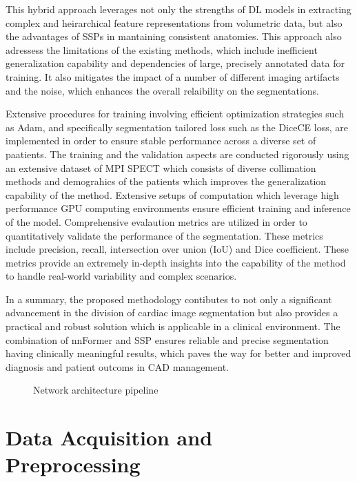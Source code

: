 This hybrid approach leverages not only the strengths of DL models in extracting complex and heirarchical feature representations from volumetric data, but also the advantages of SSPs in mantaining consistent anatomies. This approach also adressess the limitations of the existing methods, which include inefficient generalization capability and dependencies of large, precisely annotated data for training. It also mitigates the impact of a number of different imaging artifacts and the noise, which enhances the overall relaibility on the segmentations.

Extensive procedures for training involving efficient optimization strategies such as Adam, and specifically segmentation tailored loss such as the DiceCE loss, are implemented in order to ensure stable performance across a diverse set of paatients. The training and the validation aspects are conducted rigorously using an extensive dataset of MPI SPECT which consists of diverse collimation methods and demograhics of the patients which improves the generalization capability of the method. Extensive setups of computation which leverage high performance GPU computing environments ensure efficient training and inference of the model. Comprehensive evalaution metrics are utilized in order to quantitatively validate the performance of the segmentation. These metrics include precision, recall, intersection over union (IoU) and Dice coefficient. These metrics provide an extremely in-depth insights into the capability of the method to handle real-world variability and complex scenarios.

In a summary, the proposed methodology contibutes to not only a significant advancement in the division of cardiac image segmentation but also provides a practical and robust solution which is applicable in a clinical environment. The combination of nnFormer and SSP ensures reliable and precise segmentation having clinically meaningful results, which paves the way for better and improved diagnosis and patient outcoms in CAD management.

\begin{figure}[htb!]  %
    \centering
	\centering
	\resizebox{1\textwidth}{!}{
		
	}
	\caption{\centering Network architecture pipeline}
	\label{fig:network_pipeline}
\end{figure}

\section{Data Acquisition and Preprocessing}

